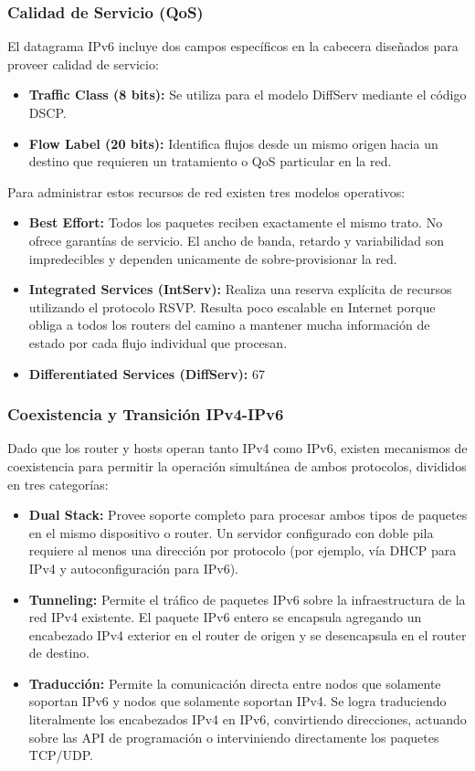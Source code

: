 \subsubsection{Calidad de Servicio (QoS)}

El datagrama IPv6 incluye dos campos específicos en la cabecera diseñados para proveer calidad de servicio:
\begin{itemize}
  \item \textbf{Traffic Class (8 bits):} Se utiliza para el modelo DiffServ mediante el código DSCP.
  \item \textbf{Flow Label (20 bits):} Identifica flujos desde un mismo origen hacia un destino que requieren un tratamiento o QoS particular en la red.
\end{itemize}

Para administrar estos recursos de red existen tres modelos operativos:
\begin{itemize}
  \item \textbf{Best Effort:} Todos los paquetes reciben exactamente el mismo trato. No ofrece garantías de servicio. El ancho de banda, retardo y variabilidad son impredecibles y dependen unicamente de sobre-provisionar la red.
  \item \textbf{Integrated Services (IntServ):} Realiza una reserva explícita de recursos utilizando el protocolo RSVP. Resulta poco escalable en Internet porque obliga a todos los routers del camino a mantener mucha información de estado por cada flujo individual que procesan.
  \item \textbf{Differentiated Services (DiffServ):} 67
\end{itemize}

\subsubsection{Coexistencia y Transición IPv4-IPv6}

Dado que los router y hosts operan tanto IPv4 como IPv6, existen mecanismos de coexistencia para permitir la operación simultánea de ambos protocolos, divididos en tres categorías:
\begin{itemize}
  \item \textbf{Dual Stack:} Provee soporte completo para procesar ambos tipos de paquetes en el mismo dispositivo o router. Un servidor configurado con doble pila requiere al menos una dirección por protocolo (por ejemplo, vía DHCP para IPv4 y autoconfiguración para IPv6).
  \item \textbf{Tunneling:} Permite el tráfico de paquetes IPv6 sobre la infraestructura de la red IPv4 existente. El paquete IPv6 entero se encapsula agregando un encabezado IPv4 exterior en el router de origen y se desencapsula en el router de destino.
  \item \textbf{Traducción:} Permite la comunicación directa entre nodos que solamente soportan IPv6 y nodos que solamente soportan IPv4. Se logra traduciendo literalmente los encabezados IPv4 en IPv6, convirtiendo direcciones, actuando sobre las API de programación o interviniendo directamente los paquetes TCP/UDP.
\end{itemize}